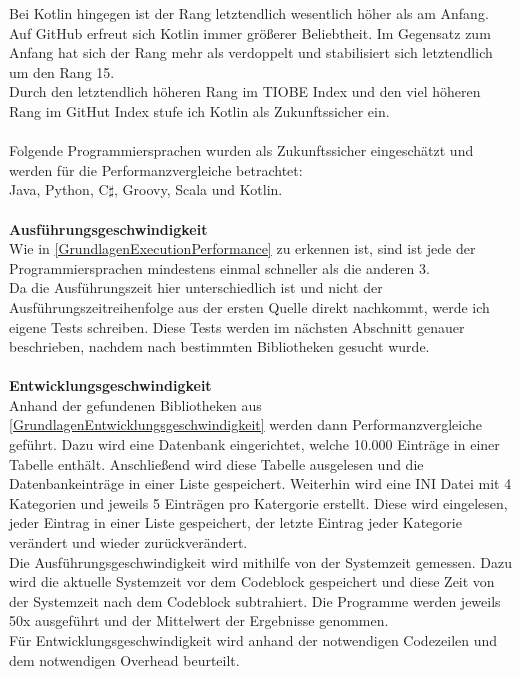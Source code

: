 \documentclass[ngerman]{article}
\begin{document}
    Bei Kotlin hingegen ist der Rang letztendlich wesentlich höher als am Anfang.\\
    Auf GitHub erfreut sich Kotlin immer größerer Beliebtheit. Im Gegensatz zum Anfang hat sich der Rang mehr als verdoppelt und stabilisiert sich letztendlich um den Rang 15.\\
    Durch den letztendlich höheren Rang im TIOBE Index und den viel höheren Rang im GitHut Index stufe ich Kotlin als Zukunftssicher ein.\\\\
    Folgende Programmiersprachen wurden als Zukunftssicher eingeschätzt und werden für die Performanzvergleiche betrachtet:\\
    Java, Python, C$\sharp$, Groovy, Scala und Kotlin.\\\\
    \textbf{Ausführungsgeschwindigkeit}\\
    Wie in \ref{GrundlagenExecutionPerformance} zu erkennen ist, sind ist jede der Programmiersprachen mindestens einmal schneller als die anderen 3.\\
    Da die Ausführungszeit hier unterschiedlich ist und nicht der Ausführungszeitreihenfolge aus der ersten Quelle direkt nachkommt, werde ich eigene Tests schreiben. Diese Tests werden im nächsten Abschnitt genauer beschrieben, nachdem nach bestimmten Bibliotheken gesucht wurde.\\\\
    \textbf{Entwicklungsgeschwindigkeit}\\
    Anhand der gefundenen Bibliotheken aus \ref{GrundlagenEntwicklungsgeschwindigkeit} werden dann Performanzvergleiche geführt. Dazu wird eine Datenbank eingerichtet, welche 10.000 Einträge in einer Tabelle enthält. Anschließend wird diese Tabelle ausgelesen und die Datenbankeinträge in einer Liste gespeichert. Weiterhin wird eine INI Datei mit 4 Kategorien und jeweils 5 Einträgen pro Katergorie erstellt. Diese wird eingelesen, jeder Eintrag in einer Liste gespeichert, der letzte Eintrag jeder Kategorie verändert und wieder zurückverändert.\\
    Die Ausführungsgeschwindigkeit wird mithilfe von der Systemzeit gemessen. Dazu wird die aktuelle Systemzeit vor dem Codeblock gespeichert und diese Zeit von der Systemzeit nach dem Codeblock subtrahiert. Die Programme werden jeweils 50x ausgeführt und der Mittelwert der Ergebnisse genommen.\\
    Für Entwicklungsgeschwindigkeit wird anhand der notwendigen Codezeilen und dem notwendigen Overhead beurteilt.\\\\
\end{document}
